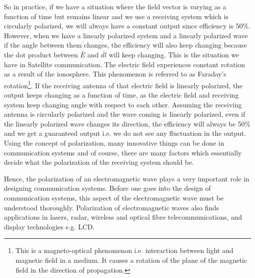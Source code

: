So in practice, if we have a situation where the field vector is varying as a function of time but remains linear and we use a receiving system which is circularly polarized, we will always have a constant output since efficiency is 50\%. However, when we have a linearly polarized system and a linearly polarized wave if the angle between them changes, the efficiency will also keep changing because the dot product between $ \bar {E} $ and $ \bar{dl} $ will keep changing. This is the situation we have in Satellite communication. The electric field experiences constant rotation as a result of the ionosphere. This phenomenon is referred to as Faraday's rotation\footnote{This is a magneto-optical phenomenon i.e. interaction between light and magnetic field in a medium. It causes a rotation of the plane of the magnetic field in the direction of propagation.}. If the receiving antenna of that electric field is linearly polarized, the output keeps changing as a function of time, as the electric field and receiving system keep changing angle with respect to each other. Assuming the receiving antenna is circularly polarized and the wave coming is linearly polarized, even if the linearly polarized wave changes its direction, the efficiency will always be 50\% and we get a guaranteed output i.e. we do not see any fluctuation in the output. Using the concept of polarization, many innovative things can be done in communication systems and of course, there are many factors which essentially decide what the polarization of the receiving system should be.

Hence, the polarization of an electromagnetic wave plays a very important role in designing communication systems. Before one goes into the design of communication systems, this aspect of the electromagnetic wave must be understood thoroughly. Polarization of electromagnetic waves also finds applications in lasers, radar, wireless and optical fibre telecommunications, and display technologies e.g. LCD.

